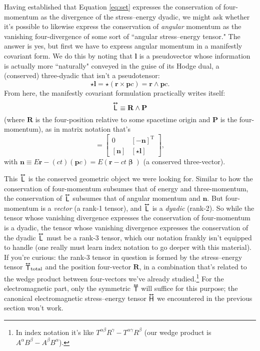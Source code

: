 \documentclass[12pt]{article}
\renewcommand{\vv}[1]{\mathbf{#1}}
\newcommand{\vvbeta}{\bm{\upbeta}}
\newcommand{\tightoverset}[2]{%
  \mathop{#2}\limits^{\vbox to -.5ex{\kern-0.75ex\hbox{$#1$}\vss}}}
\newcommand{\inlinedy}[1]{\tightoverset{\text{\tiny$\bm\leftrightarrow$}}{#1}}
\newcommand{\capdy}[1]{ \overset{ \text{\tiny$\bm\leftrightarrow$} }{\vphantom{\text{\small{A}}}\smash{#1}} }
\begin{document}
Having established that Equation \ref{eq:set} expresses the conservation of four-momentum as the divergence of the stress--energy dyadic, we might ask whether it's possible to likewise express the conservation of \emph{angular} momentum as the vanishing four-divergence of some sort of ``angular stress--energy tensor." The answer is yes, but first we have to express angular momentum in a manifestly covariant form. We do this by noting that $\vv l$ is a pseudovector whose information is actually more ``naturally" conveyed in the guise of its Hodge dual, a (conserved) three-dyadic that isn't a pseudotensor:
\begin{equation*}
\star \vv l =  \star ( \vv r \times \vv p c ) = \vv r \wedge \vv p c .
\end{equation*}
From here, the manifestly covariant formulation practically writes itself:
\begin{equation*}
\capdy{\mathsf{L}} \equiv \vv R \wedge \vv P
\end{equation*}
(where $\vv R$ is the four-position relative to some spacetime origin and $\vv P$ is the four-momentum), as in matrix notation that's
\begin{equation*}
[ \capdy{\mathsf{L}} ]
=
\begin{bmatrix}
0 & [ - \vv n ]^\mathrm{T} \\[1ex]
[ \vv n ] & [ \star \vv l ]
\end{bmatrix} ,
\end{equation*}
with $\vv n \equiv E \vv r - (ct)(\vv p c) = E (  \vv r - ct \vvbeta )$ (a conserved three-vector).

This $\inlinedy{\mathsf{L}}$ is the conserved geometric object we were looking for. Similar to how the conservation of four-momentum subsumes that of energy and three-momentum, the conservation of $\inlinedy{\mathsf{L}}$ subsumes that of angular momentum and $\vv n$. But four-momentum is a \emph{vector} (a rank-1 tensor), and $\inlinedy{\mathsf{L}}$ is a \emph{dyadic} (rank-2). So while the tensor whose vanishing divergence expresses the conservation of four-momentum is a dyadic, the tensor whose vanishing divergence expresses the conservation of the dyadic $\inlinedy{\mathsf{L}}$ must be a rank-3 tensor, which our notation frankly isn't equipped to handle (one really must learn index notation to go deeper with this material). If you're curious: the rank-3 tensor in question is formed by the stress--energy tensor ${\inlinedy{\mathsf{T}}} _{\textrm{total}}$ and the position four-vector $\vv R$, in a combination that's related to the wedge product between four-vectors we've already studied.\footnote{In index notation it's like $T^{\alpha \beta} R^{\gamma} - T^{\alpha \gamma} R^{\beta}$ (our wedge product is $A^{\alpha} B^{\beta} - A^{\beta} B^{\alpha}$).} For the electromagnetic part, only the symmetric $\inlinedy{\mathsf{T}}$ will suffice for this purpose; the canonical electromagnetic stress--energy tensor $\inlinedy{\mathsf{H}}$ we encountered in the previous section won't work.
\end{document}
